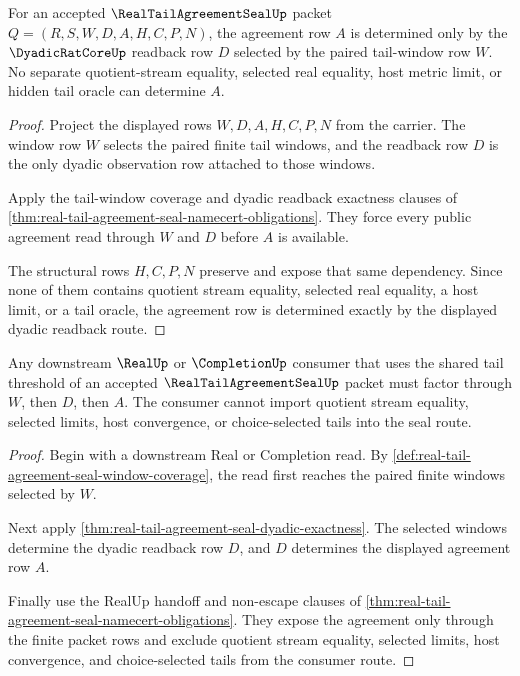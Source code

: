 \begin{theorem}
\label{thm:real-tail-agreement-seal-dyadic-exactness}
For an accepted $\RealTailAgreementSealUp$ packet $Q=(R,S,W,D,A,H,C,P,N)$, the agreement row $A$ is determined only by the $\DyadicRatCoreUp$ readback row $D$ selected by the paired tail-window row $W$. No separate quotient-stream equality, selected real equality, host metric limit, or hidden tail oracle can determine $A$.
\end{theorem}
\begin{proof}
Project the displayed rows $W,D,A,H,C,P,N$ from the carrier. The window row $W$ selects the paired finite tail windows, and the readback row $D$ is the only dyadic observation row attached to those windows.

Apply the tail-window coverage and dyadic readback exactness clauses of \autoref{thm:real-tail-agreement-seal-namecert-obligations}. They force every public agreement read through $W$ and $D$ before $A$ is available.

The structural rows $H,C,P,N$ preserve and expose that same dependency. Since none of them contains quotient stream equality, selected real equality, a host limit, or a tail oracle, the agreement row is determined exactly by the displayed dyadic readback route.
\end{proof}

\begin{theorem}
\label{thm:real-tail-agreement-seal-shared-threshold-nonescape}
Any downstream $\RealUp$ or $\CompletionUp$ consumer that uses the shared tail threshold of an accepted $\RealTailAgreementSealUp$ packet must factor through $W$, then $D$, then $A$. The consumer cannot import quotient stream equality, selected limits, host convergence, or choice-selected tails into the seal route.
\end{theorem}
\begin{proof}
Begin with a downstream Real or Completion read. By \autoref{def:real-tail-agreement-seal-window-coverage}, the read first reaches the paired finite windows selected by $W$.

Next apply \autoref{thm:real-tail-agreement-seal-dyadic-exactness}. The selected windows determine the dyadic readback row $D$, and $D$ determines the displayed agreement row $A$.

Finally use the RealUp handoff and non-escape clauses of \autoref{thm:real-tail-agreement-seal-namecert-obligations}. They expose the agreement only through the finite packet rows and exclude quotient stream equality, selected limits, host convergence, and choice-selected tails from the consumer route.
\end{proof}

